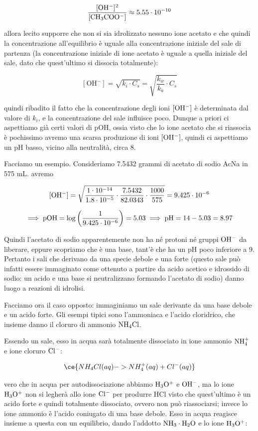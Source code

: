 $$\rm{\frac{[OH^-]^2}{[CH_3COO^-]}} \approx 5.55 \cdot 10^{-10}$$

\E allora lecito supporre che non si sia idrolizzato nessuno ione acetato e che quindi la concentrazione all'equilibrio è uguale alla concentrazione iniziale del sale di partenza (la concentrazione iniziale di ione acetato è uguale a quella iniziale del sale, dato che quest'ultimo si dissocia totalmente):

$$[\text{OH}^-]=\sqrt{k_i \cdot C_s}=\sqrt{\frac{k_w}{k_a}\cdot C_s}$$

\E quindi ribadito il fatto che la concentrazione degli ioni $\rm [OH^-]$ è determinata dal valore di $k_i$, e la concentrazione del sale influisce poco. Dunque a priori ci aspettiamo già certi valori di pOH, ossia visto che lo ione acetato che si riassocia è pochissimo avremo una scarsa produzione di ioni $\rm [OH^-]$, quindi ci aspettiamo un pH basso, vicino alla neutralità, circa 8.

Facciamo un esempio. Consideriamo 7.5432 grammi di acetato di sodio AcNa in 575 mL. avremo

$$\rm [OH^-]=\sqrt{\frac{1 \cdot 10^{-14}}{1.8 \cdot 10^{-5}}\cdot \frac{7.5432}{82.0343} \cdot \frac{1000}{575}}=9.425 \cdot 10^{-6}$$

$$\implies \rm pOH = \log \left( \frac{1}{9.425 \cdot 10^{-6}} \right)=5.03 \implies pH= 14-5.03=8.97$$

Quindi l'acetato di sodio apparentemente non ha né protoni né gruppi $\rm OH^-$ da liberare, eppure scopriamo che è una base, tant'è che ha un pH poco inferiore a 9. Pertanto i sali che derivano da una specie debole e una forte (questo sale può infatti essere immaginato come ottenuto a partire da acido acetico e idrossido di sodio: un acido e una base si neutralizzano formando l'acetato di sodio) danno luogo a reazioni di idrolisi.

\vspace{0.4cm}Facciamo ora il caso opposto: immaginiamo un sale derivante da una base debole e un acido forte. Gli esempi tipici sono l'ammoniaca e l'acido cloridrico, che insieme danno il cloruro di ammonio $\rm NH_4Cl$.

Essendo un sale, esso in acqua sarà totalmente dissociato in ione ammonio $\rm NH_4^+$ e ione cloruro $\rm Cl^-$:

$$\ce{NH_4Cl(aq) -> NH_4^+(aq) + Cl^-(aq)}$$

\E vero che in acqua per autodissociazione abbiamo $\rm H_3O^+$ e $\rm OH^-$, ma lo ione $\rm H_3O^+$ non si legherà allo ione $\rm Cl^-$ per produrre HCl visto che quest'ultimo è un acido forte e quindi totalmente dissociato, ovvero non può riassociarsi; invece lo ione ammonio è l'acido coniugato di una base debole. Esso in acqua reagisce insieme a questa con un equilibrio, dando l'addotto $\rm NH_3 \cdot H_2O$ e lo ione $\rm H_3O^+$:

